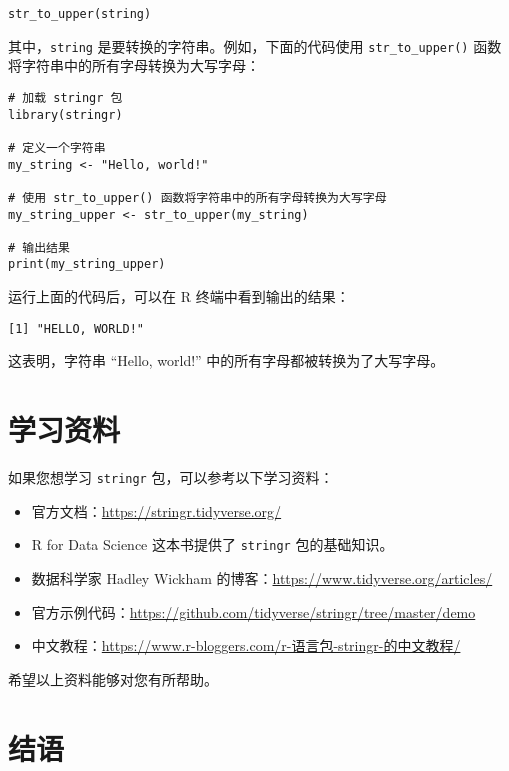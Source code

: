 \documentclass[
  letterpaper,
  DIV=11,
  numbers=noendperiod]{scrreprt}
\providecommand{\tightlist}{%
  \setlength{\itemsep}{0pt}\setlength{\parskip}{0pt}}\usepackage{longtable,booktabs,array}
\begin{document}
\begin{verbatim}
str_to_upper(string)
\end{verbatim}

其中，\texttt{string} 是要转换的字符串。例如，下面的代码使用
\texttt{str\_to\_upper()} 函数将字符串中的所有字母转换为大写字母：

\begin{verbatim}
# 加载 stringr 包
library(stringr)

# 定义一个字符串
my_string <- "Hello, world!"

# 使用 str_to_upper() 函数将字符串中的所有字母转换为大写字母
my_string_upper <- str_to_upper(my_string)

# 输出结果
print(my_string_upper)
\end{verbatim}

运行上面的代码后，可以在 R 终端中看到输出的结果：

\begin{verbatim}
[1] "HELLO, WORLD!"
\end{verbatim}

这表明，字符串 ``Hello, world!'' 中的所有字母都被转换为了大写字母。

\hypertarget{ux5b66ux4e60ux8d44ux6599}{%
\section{学习资料}\label{ux5b66ux4e60ux8d44ux6599}}

如果您想学习 \texttt{stringr} 包，可以参考以下学习资料：

\begin{itemize}
\tightlist
\item
  官方文档：\url{https://stringr.tidyverse.org/}
\item
  R for Data Science 这本书提供了 \texttt{stringr} 包的基础知识。
\item
  数据科学家 Hadley Wickham
  的博客：\url{https://www.tidyverse.org/articles/}
\item
  官方示例代码：\url{https://github.com/tidyverse/stringr/tree/master/demo}
\item
  中文教程：\url{https://www.r-bloggers.com/r-语言包-stringr-的中文教程/}
\end{itemize}

希望以上资料能够对您有所帮助。

\hypertarget{ux7ed3ux8bed}{%
\section{结语}\label{ux7ed3ux8bed}}
\end{document}
